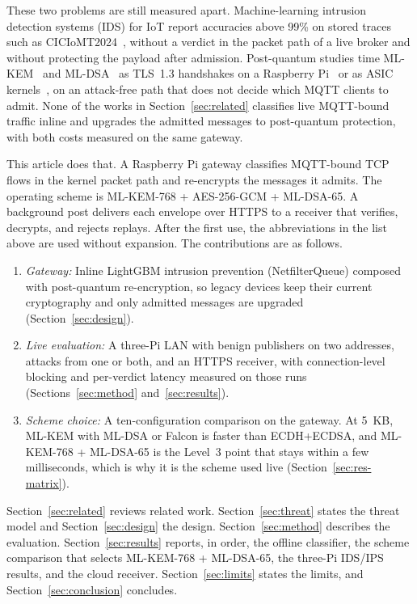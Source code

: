 \documentclass[journal]{IEEEtran}
\begin{document}
These two problems are still measured apart. Machine-learning intrusion detection systems (IDS) for IoT report accuracies above 99\% on stored traces such as CICIoMT2024~\cite{ciciomt2024,abid2025gwo,wang2025skd,soomro2025roche}, without a verdict in the packet path of a live broker and without protecting the payload after admission. Post-quantum studies time ML-KEM~\cite{nist_fips203} and ML-DSA~\cite{nist_fips204} as TLS~1.3 handshakes on a Raspberry Pi~\cite{shahid2026pqtls} or as ASIC kernels~\cite{dimatteo2026kem22}, on an attack-free path that does not decide which MQTT clients to admit. None of the works in Section~\ref{sec:related} classifies live MQTT-bound traffic inline and upgrades the admitted messages to post-quantum protection, with both costs measured on the same gateway.

This article does that. A Raspberry Pi gateway classifies MQTT-bound TCP flows in the kernel packet path and re-encrypts the messages it admits. The operating scheme is ML-KEM-768 + AES-256-GCM + ML-DSA-65. A background post delivers each envelope over HTTPS to a receiver that verifies, decrypts, and rejects replays. After the first use, the abbreviations in the list above are used without expansion. The contributions are as follows.
\begin{enumerate}
  \item \textit{Gateway:} Inline LightGBM intrusion prevention (NetfilterQueue) composed with post-quantum re-encryption, so legacy devices keep their current cryptography and only admitted messages are upgraded (Section~\ref{sec:design}).
  \item \textit{Live evaluation:} A three-Pi LAN with benign publishers on two addresses, attacks from one or both, and an HTTPS receiver, with connection-level blocking and per-verdict latency measured on those runs (Sections~\ref{sec:method} and~\ref{sec:results}).
  \item \textit{Scheme choice:} A ten-configuration comparison on the gateway. At 5~KB, ML-KEM with ML-DSA or Falcon is faster than ECDH+ECDSA, and ML-KEM-768 + ML-DSA-65 is the Level~3 point that stays within a few milliseconds, which is why it is the scheme used live (Section~\ref{sec:res-matrix}).
\end{enumerate}

Section~\ref{sec:related} reviews related work. Section~\ref{sec:threat} states the threat model and Section~\ref{sec:design} the design. Section~\ref{sec:method} describes the evaluation. Section~\ref{sec:results} reports, in order, the offline classifier, the scheme comparison that selects ML-KEM-768 + ML-DSA-65, the three-Pi IDS/IPS results, and the cloud receiver. Section~\ref{sec:limits} states the limits, and Section~\ref{sec:conclusion} concludes.
\end{document}

